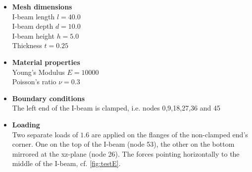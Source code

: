  \begin{itemize}
  \item \textbf{Mesh dimensions}\\
  I-beam length $l = 40.0$\\
  I-beam depth $d = 10.0$\\
  I-beam height $h = 5.0$\\
  Thickness $t = 0.25$
     	
  \item \textbf{Material properties}\\
  Young's Modulus $E = 10000$\\
  Poisson's ratio $\nu = 0.3$
     	
  \item \textbf{Boundary conditions}\\
  The left end of the I-beam is clamped, i.e. nodes 0,9,18,27,36 and 45
     	
  \item \textbf{Loading}\\
  Two separate loads of $1.6$ are applied on the flanges of the non-clamped end's corner. One on the top of the I-beam (node 53), the other on the bottom mirrored at the xz-plane (node 26). The forces pointing horizontally to the middle of the I-beam, cf. \ref{fig:testE}.
 \end{itemize}
 
